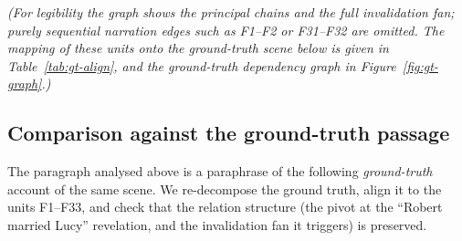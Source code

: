 \documentclass[11pt]{article}
\begin{document}
\begin{center}
\end{center}

\noindent\emph{(For legibility the graph shows the principal chains and the full
invalidation fan; purely sequential narration edges such as F1--F2 or F31--F32
are omitted. The mapping of these units onto the ground-truth scene below is
given in Table~\ref{tab:gt-align}, and the ground-truth dependency graph in
Figure~\ref{fig:gt-graph}.)}

\subsection*{Comparison against the ground-truth passage}

The paragraph analysed above is a paraphrase of the following \emph{ground-truth}
account of the same scene. We re-decompose the ground truth, align it to the
units F1--F33, and check that the relation structure (the pivot at the
``Robert married Lucy'' revelation, and the invalidation fan it triggers) is
preserved.
\end{document}
